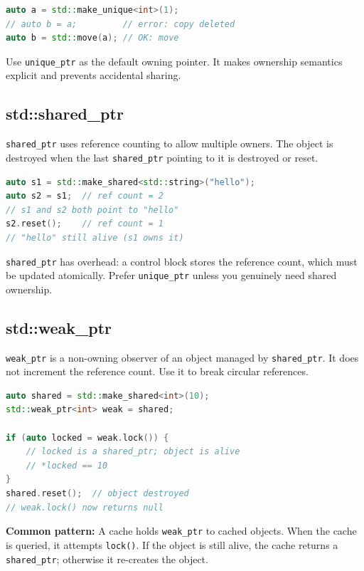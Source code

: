 \begin{lstlisting}[language=C++]
auto a = std::make_unique<int>(1);
// auto b = a;         // error: copy deleted
auto b = std::move(a); // OK: move
\end{lstlisting}

Use \texttt{unique\_ptr} as the default owning pointer. It makes ownership semantics explicit and prevents accidental sharing.

\subsection{std::shared\_ptr}

\texttt{shared\_ptr} uses reference counting to allow multiple owners. The object is destroyed when the last \texttt{shared\_ptr} pointing to it is destroyed or reset.

\begin{lstlisting}[language=C++]
auto s1 = std::make_shared<std::string>("hello");
auto s2 = s1;  // ref count = 2
// s1 and s2 both point to "hello"
s2.reset();    // ref count = 1
// "hello" still alive (s1 owns it)
\end{lstlisting}

\texttt{shared\_ptr} has overhead: a control block stores the reference count, which must be updated atomically. Prefer \texttt{unique\_ptr} unless you genuinely need shared ownership.

\subsection{std::weak\_ptr}

\texttt{weak\_ptr} is a non-owning observer of an object managed by \texttt{shared\_ptr}. It does not increment the reference count. Use it to break circular references.

\begin{lstlisting}[language=C++]
auto shared = std::make_shared<int>(10);
std::weak_ptr<int> weak = shared;

if (auto locked = weak.lock()) {
    // locked is a shared_ptr; object is alive
    // *locked == 10
}
shared.reset();  // object destroyed
// weak.lock() now returns null
\end{lstlisting}

\textbf{Common pattern:} A cache holds \texttt{weak\_ptr} to cached objects. When the cache is queried, it attempts \texttt{lock()}. If the object is still alive, the cache returns a \texttt{shared\_ptr}; otherwise it re-creates the object.

